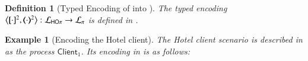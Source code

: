 \documentclass[preprint,11pt]{elsarticle}
\newtheorem{definition}{Definition}[section]
\newtheorem{example}{Example}[section]
\newcommand{\Client}{\mathsf{Client}}
\begin{document}
{{%

\begin{definition}[Typed Encoding of \HOp into \sessp]
\label{d:enc:hopitopi}
The typed encoding 
$\enco{\map{\cdot}^{2}, \mapt{\cdot}^{2} %
}: \tyl{L}_{\HOp} \to \tyl{L}_{\sessp}$  
is defined
in . 
\end{definition}



\begin{example}[Encoding the Hotel client]
The Hotel client scenario is described in 
 as the \HOp process $\Client_1$. Its encoding in \sessp is as follows:


\end{example}}}
\end{document}
